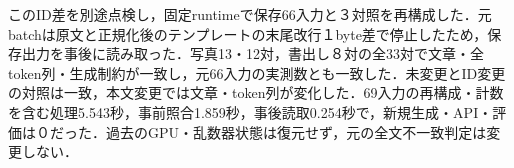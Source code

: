 このID差を別途点検し，固定runtimeで保存66入力と３対照を再構成した．元batchは原文と正規化後のテンプレートの末尾改行１byte差で停止したため，保存出力を事後に読み取った．写真13・12対，書出し８対の全33対で文章・全token列・生成制約が一致し，元66入力の実測数とも一致した．未変更とID変更の対照は一致，本文変更では文章・token列が変化した．69入力の再構成・計数を含む処理5.543秒，事前照合1.859秒，事後読取0.254秒で，新規生成・API・評価は０だった．過去のGPU・乱数器状態は復元せず，元の全文不一致判定は変更しない．
